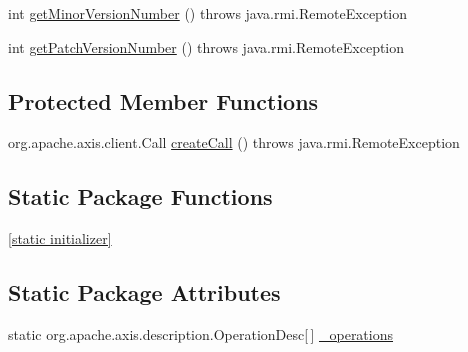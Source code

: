 \begin{DoxyCompactItemize}
\item 
int \hyperlink{classorg_1_1glite_1_1security_1_1voms_1_1service_1_1admin_1_1VOMSAdminSoapBindingStub_a78c7405c25c21ed427fda07c3920ee0a}{getMinorVersionNumber} ()  throws java.rmi.RemoteException 
\item 
int \hyperlink{classorg_1_1glite_1_1security_1_1voms_1_1service_1_1admin_1_1VOMSAdminSoapBindingStub_ac803c470ba71f049cec5dbc49ba58db1}{getPatchVersionNumber} ()  throws java.rmi.RemoteException 
\end{DoxyCompactItemize}
\subsection*{Protected Member Functions}
\begin{DoxyCompactItemize}
\item 
org.apache.axis.client.Call \hyperlink{classorg_1_1glite_1_1security_1_1voms_1_1service_1_1admin_1_1VOMSAdminSoapBindingStub_a8c426e4b46b695345dec8ba4e014ec1b}{createCall} ()  throws java.rmi.RemoteException 
\end{DoxyCompactItemize}
\subsection*{Static Package Functions}
\begin{DoxyCompactItemize}
\item 
\hyperlink{classorg_1_1glite_1_1security_1_1voms_1_1service_1_1admin_1_1VOMSAdminSoapBindingStub_aa5af34d355b7fb9e715cd922348cba01}{\mbox{[}static initializer\mbox{]}}
\end{DoxyCompactItemize}
\subsection*{Static Package Attributes}
\begin{DoxyCompactItemize}
\item 
static org.apache.axis.description.OperationDesc\mbox{[}$\,$\mbox{]} \hyperlink{classorg_1_1glite_1_1security_1_1voms_1_1service_1_1admin_1_1VOMSAdminSoapBindingStub_af51610a352251fae1a50730c49eb0a57}{\_\-operations}
\end{DoxyCompactItemize}
